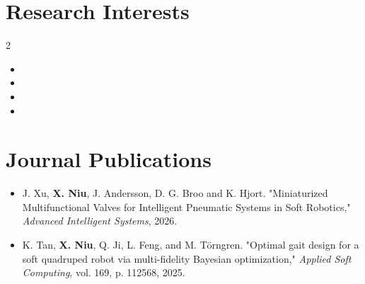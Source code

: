 \documentclass[a4paper,11pt]{article}
\newcommand{\resumeSubHeadingListStart}{\begin{itemize}[leftmargin=*,labelsep=0mm,itemsep=-2pt]}
\newcommand{\resumeSubHeadingListEnd}{\end{itemize}\vspace{2mm}}
\begin{document}
\section{\textbf{Research Interests}}
\vspace{-2.5mm}
\begin{multicols}{2}
  \resumeSubHeadingListStart
    \item \hspace{0.5em}{Cyber-Physical Systems}
    \item \hspace{0.5em}{Reinforcement Learning}
    \item \hspace{0.5em}{Control \& Dynamics}
    \item \hspace{0.5em}{Heterogeneous Robots Collaboration}
  \resumeSubHeadingListEnd
\vspace{-5.5mm}
\end{multicols}

\section{\textbf{Journal Publications}}
\resumeSubHeadingListStart
\vspace{3mm}
  \item \hspace{0.3mm} J. Xu, \textbf{X. Niu}, J. Andersson, D. G. Broo and K. Hjort. "Miniaturized Multifunctional Valves for Intelligent Pneumatic Systems in Soft Robotics," \textit{Advanced Intelligent Systems}, 2026.
  \item \hspace{0.3mm} K. Tan, \textbf{X. Niu}, Q. Ji, L. Feng, and M. Törngren. "Optimal gait design for a soft quadruped robot via multi-fidelity Bayesian optimization," \textit{Applied Soft Computing}, vol. 169, p. 112568, 2025.
  
\resumeSubHeadingListEnd
\vspace{-5.5mm}

\end{document}
